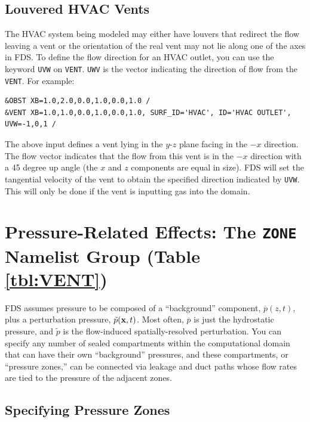 \documentclass[11pt]{book}
\newcommand{\ct}{\tt\small}
\newcommand{\bx}{{\bf x}}
\newcommand{\tp}{\tilde{p}}
\newcommand{\bp}{\overline{p}}
\begin{document}
\subsection{Louvered HVAC Vents}
\label{info:HVAClouvers}

The HVAC system being modeled may either have louvers that redirect the flow leaving a vent or the orientation of the real vent may not lie along one of the axes in FDS.  To define the flow direction for an HVAC outlet, you can use the keyword {\ct UVW} on {\ct VENT}.  {\ct UWV} is the vector indicating the direction of flow from the {\ct VENT}.  For example:

\footnotesize
\begin{verbatim}
&OBST XB=1.0,2.0,0.0,1.0,0.0,1.0 /
&VENT XB=1.0,1.0,0.0,1.0,0.0,1.0, SURF_ID='HVAC', ID='HVAC OUTLET', UVW=-1,0,1 /
\end{verbatim}\normalsize

\noindent The above input defines a vent lying in the $y$-$z$ plane facing in the $-x$ direction.  The flow vector indicates that the flow from this vent is in the $-x$ direction with a 45 degree up angle (the $x$ and $z$ components are equal in size).  FDS will set the tangential velocity of the vent to obtain the specified direction indicated by {\ct UVW}.  This will only be done if the vent is inputting gas into the domain.



\clearpage

\section{Pressure-Related Effects: The \texorpdfstring{{\tt ZONE}}{ZONE} Namelist Group (Table \ref{tbl:VENT})}
\label{info:ZONE}

FDS assumes pressure to be composed of a ``background'' component, $\bp(z,t)$, plus a perturbation pressure, $\tp(\bx,t)$. Most
often, $\bp$ is just the hydrostatic pressure, and $\tp$ is the flow-induced spatially-resolved perturbation.
You can specify any number of sealed compartments within the computational
domain that can have their own ``background'' pressures, and these compartments, or ``pressure zones,'' can be connected via leakage and duct paths whose
flow rates are tied to the pressure of the adjacent zones.



\subsection{Specifying Pressure Zones}
\label{info:ZONE_Basics}
\end{document}
